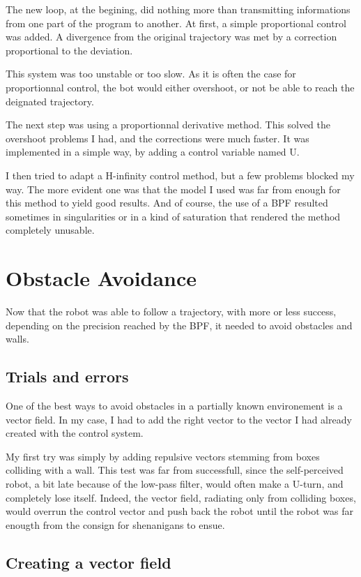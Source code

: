 The new loop, at the begining, did nothing more than transmitting informations from one part of the program to another.
At first, a simple proportional control was added. A divergence from the original trajectory was met by a correction proportional to the deviation.

This system was too unstable or too slow.
As it is often the case for proportionnal control, the bot would either overshoot, or not be able to reach the deignated trajectory.

The next step was using a proportionnal derivative method. This solved the overshoot problems I had, and the corrections were much faster.
It was implemented in a simple way, by adding a control variable named U.

I then tried to adapt a H-infinity control method, but a few problems blocked my way.
The more evident one was that the model I used was far from enough for this method to yield good results.
And of course, the use of a BPF resulted sometimes in singularities or in a kind of saturation that rendered the method completely unusable.


\section{Obstacle Avoidance}
Now that the robot was able to follow a trajectory, with more or less success, depending on the precision reached by the BPF, it needed to avoid obstacles and walls.


\subsection{Trials and errors}

One of the best ways to avoid obstacles in a partially known environement is a vector field.
In my case, I had to add the right vector to the vector I had already created with the control system.

My first try was simply by adding repulsive vectors stemming from boxes colliding with a wall.
This test was far from successfull, since the self-perceived robot, a bit late because of the low-pass filter, would often make a U-turn, and completely lose itself.
Indeed, the vector field, radiating only from colliding boxes, would overrun the control vector and push back the robot until the robot was far enougth from the consign for shenanigans to ensue.


\subsection{Creating a vector field}

